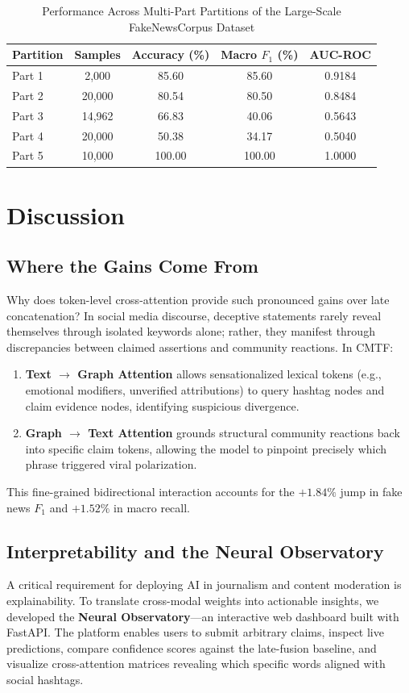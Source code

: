 \documentclass[conference]{IEEEtran}
\begin{document}
\begin{table}[t]
\caption{Performance Across Multi-Part Partitions of the Large-Scale FakeNewsCorpus Dataset}
\label{tab:parts_summary}
\centering
\begin{tabular}{lcccc}
\toprule
\textbf{Partition} & \textbf{Samples} & \textbf{Accuracy (\%)} & \textbf{Macro $F_1$ (\%)} & \textbf{AUC-ROC} \\
\midrule
Part 1 & 2,000 & 85.60 & 85.60 & 0.9184 \\
Part 2 & 20,000 & 80.54 & 80.50 & 0.8484 \\
Part 3 & 14,962 & 66.83 & 40.06 & 0.5643 \\
Part 4 & 20,000 & 50.38 & 34.17 & 0.5040 \\
Part 5 & 10,000 & 100.00 & 100.00 & 1.0000 \\
\bottomrule
\end{tabular}
\end{table}

\section{Discussion}

\subsection{Where the Gains Come From}
Why does token-level cross-attention provide such pronounced gains over late concatenation? In social media discourse, deceptive statements rarely reveal themselves through isolated keywords alone; rather, they manifest through discrepancies between claimed assertions and community reactions. In CMTF:
\begin{enumerate}
    \item \textbf{Text $\to$ Graph Attention} allows sensationalized lexical tokens (e.g., emotional modifiers, unverified attributions) to query hashtag nodes and claim evidence nodes, identifying suspicious divergence.
    \item \textbf{Graph $\to$ Text Attention} grounds structural community reactions back into specific claim tokens, allowing the model to pinpoint precisely which phrase triggered viral polarization.
\end{enumerate}
This fine-grained bidirectional interaction accounts for the $+1.84\%$ jump in fake news $F_1$ and $+1.52\%$ in macro recall.

\subsection{Interpretability and the Neural Observatory}
A critical requirement for deploying AI in journalism and content moderation is explainability. To translate cross-modal weights into actionable insights, we developed the \textbf{Neural Observatory}---an interactive web dashboard built with FastAPI. The platform enables users to submit arbitrary claims, inspect live predictions, compare confidence scores against the late-fusion baseline, and visualize cross-attention matrices revealing which specific words aligned with social hashtags.
\end{document}
